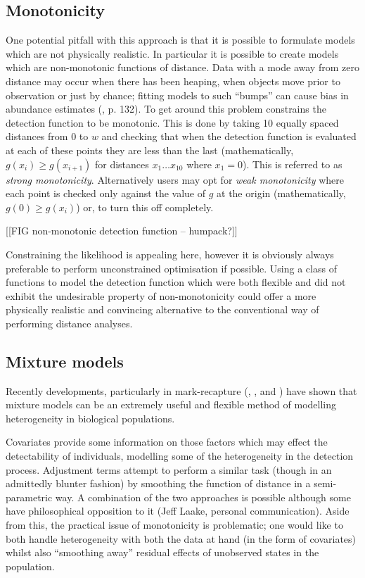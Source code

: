 \subsection{Monotonicity}
One potential pitfall with this approach is that  it is possible to formulate models which are not physically realistic. In particular it is possible to create models which are non-monotonic functions of distance. Data with a mode away from zero distance may occur when there has been heaping, when objects move prior to observation or just by chance; fitting models to such ``bumps'' can cause bias in abundance estimates (\cite{IDS}, p. 132). To get around this problem \cite{distance-software} constrains the detection function to be monotonic. This is done by taking 10 equally spaced distances from $0$ to $w$ and checking that when the detection function is evaluated at each of these points they are less than the last (mathematically, $g(x_i)\geq g(x_{i+1})$ for distances $x_1 \dots x_10$ where $x_1=0$). This is referred to as \textit{strong monotonicity}. Alternatively users may opt for \textit{weak monotonicity} where each point is checked only against the value of $g$ at the origin (mathematically, $g(0)\geq g(x_i)$) or, to turn this off completely.

[[FIG non-monotonic detection function -- humpack?]]

Constraining the likelihood is appealing here, however it is obviously always preferable to perform unconstrained optimisation if possible. Using a class of functions to model the detection function which were both flexible and did not exhibit the undesirable property of non-monotonicity could offer a more physically realistic and convincing alternative to the conventional way of performing distance analyses.


\subsection{Mixture models}
Recently developments, particularly in mark-recapture (\cite{pledger2000}, \cite{dorazio03}, \cite{pledger2005} and \cite{morgan08}) have shown that mixture models can be an extremely useful and flexible method of modelling heterogeneity in biological populations.

Covariates provide some information on those factors which may effect the detectability of individuals, modelling some of the heterogeneity in the detection process. Adjustment terms attempt to perform a similar task (though in an admittedly blunter fashion) by smoothing the function of distance in a semi-parametric way. A combination of the two approaches is possible although some have philosophical opposition to it (Jeff Laake, personal communication). Aside from this, the practical issue of monotonicity is problematic; one would like to both handle heterogeneity with both the data at hand (in the form of covariates) whilst also ``smoothing away'' residual effects of unobserved states in the population.

